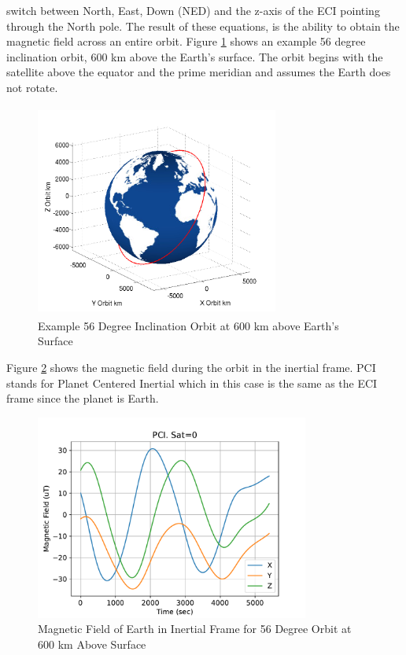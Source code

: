 \documentclass{article}
\begin{document}
switch between North, East, Down (NED) and the z-axis of the ECI
pointing through the North pole. The result of these equations, is the
ability to obtain the magnetic field  
across an entire orbit. Figure \ref{f:orbit} shows an example 56
degree inclination orbit, 600 km above the Earth's surface. The orbit
begins with the satellite above the equator and the prime meridian and
assumes the Earth does not rotate.
\begin{figure}[H]
  \begin{center}
  \includegraphics[height=70mm, width=80mm]{Figures/Earth_Orbit.png}
  \end{center}
  \caption{Example 56 Degree Inclination Orbit at 600 km above Earth's
  Surface}\label{f:orbit}
\end{figure}
Figure \ref{f:mag_orbit} shows the magnetic field during the orbit in the
inertial frame. PCI stands for Planet Centered Inertial which in this
case is the same as the ECI frame since the planet is Earth. 
\begin{figure}[H]
  \begin{center}
  \includegraphics[width=90mm]{Figures/Magnetic_Field_Orbit}
  \end{center}
  \caption{Magnetic Field of Earth in Inertial Frame for 56 Degree
    Orbit at 600 km Above Surface}\label{f:mag_orbit}
\end{figure}
\end{document}
